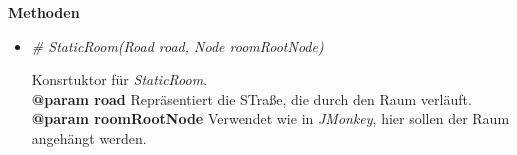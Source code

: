             \textbf{Methoden}					
            \begin{itemize}
                \item  \textit{\# StaticRoom(Road road, Node roomRootNode)}
                    \begin{leftbar}[0.9\linewidth]
                        Konsrtuktor für \textit{StaticRoom}.\\
                        \textbf{@param road} Repräsentiert die STraße, die durch den Raum verläuft.\\
                        \textbf{@param roomRootNode}  Verwendet wie in \textit{JMonkey}, hier sollen der Raum angehängt werden.
                    \end{leftbar}
 
            \end{itemize}

       
       
       
        
        
        
        